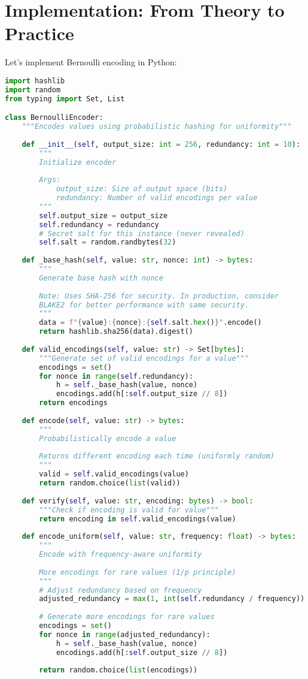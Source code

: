 \section{Implementation: From Theory to Practice}

Let's implement Bernoulli encoding in Python:

\begin{lstlisting}[language=Python, caption={Bernoulli encoding implementation}]
import hashlib
import random
from typing import Set, List

class BernoulliEncoder:
    """Encodes values using probabilistic hashing for uniformity"""
    
    def __init__(self, output_size: int = 256, redundancy: int = 10):
        """
        Initialize encoder
        
        Args:
            output_size: Size of output space (bits)
            redundancy: Number of valid encodings per value
        """
        self.output_size = output_size
        self.redundancy = redundancy
        # Secret salt for this instance (never revealed)
        self.salt = random.randbytes(32)
    
    def _base_hash(self, value: str, nonce: int) -> bytes:
        """
        Generate base hash with nonce
        
        Note: Uses SHA-256 for security. In production, consider
        BLAKE2 for better performance with same security.
        """
        data = f"{value}:{nonce}:{self.salt.hex()}".encode()
        return hashlib.sha256(data).digest()
    
    def valid_encodings(self, value: str) -> Set[bytes]:
        """Generate set of valid encodings for a value"""
        encodings = set()
        for nonce in range(self.redundancy):
            h = self._base_hash(value, nonce)
            encodings.add(h[:self.output_size // 8])
        return encodings
    
    def encode(self, value: str) -> bytes:
        """
        Probabilistically encode a value
        
        Returns different encoding each time (uniformly random)
        """
        valid = self.valid_encodings(value)
        return random.choice(list(valid))
    
    def verify(self, value: str, encoding: bytes) -> bool:
        """Check if encoding is valid for value"""
        return encoding in self.valid_encodings(value)
    
    def encode_uniform(self, value: str, frequency: float) -> bytes:
        """
        Encode with frequency-aware uniformity
        
        More encodings for rare values (1/p principle)
        """
        # Adjust redundancy based on frequency
        adjusted_redundancy = max(1, int(self.redundancy / frequency))
        
        # Generate more encodings for rare values
        encodings = set()
        for nonce in range(adjusted_redundancy):
            h = self._base_hash(value, nonce)
            encodings.add(h[:self.output_size // 8])
        
        return random.choice(list(encodings))
\end{lstlisting}

